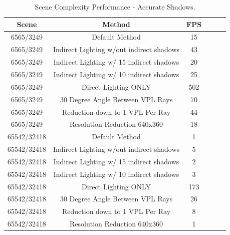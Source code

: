 \begin{table}[h!]\centering
	\caption{Scene Complexity Performance - Accurate Shadows.}
	\begin{center}
	    \begin{tabular}{ | c | c | c | c | c | c |}
	    \hline
	    Scene & Method & FPS\\ \hline
	    6565/3249 & Default Method & 15\\ \hline
	    6565/3249 & Indirect Lighting w/out indirect shadows & 43\\ \hline
	    6565/3249 & Indirect Lighting w/ 15 indirect shadows & 20\\ \hline
	    6565/3249 & Indirect Lighting w/ 10 indirect shadows & 25\\ \hline
	    6565/3249 & Direct Lighting ONLY & 502\\ \hline
	    6565/3249 & 30 Degree Angle Between VPL Rays & 70\\ \hline
	    6565/3249 & Reduction down to 1 VPL Per Ray & 44\\ \hline
	    6565/3249 & Resolution Reduction 640x360 & 18\\ \hline
	    \hline
	    \hline
	    65542/32418 & Default Method & 1\\ \hline
	    65542/32418 & Indirect Lighting w/out indirect shadows & 5\\ \hline
	    65542/32418 & Indirect Lighting w/ 15 indirect shadows & 2\\ \hline
	    65542/32418 & Indirect Lighting w/ 10 indirect shadows & 3\\ \hline
	    65542/32418 & Direct Lighting ONLY & 173\\ \hline
	    65542/32418 & 30 Degree Angle Between VPL Rays & 26\\ \hline
	    65542/32418 & Reduction down to 1 VPL Per Ray & 8\\ \hline
	    65542/32418 & Resolution Reduction 640x360 & 1\\ \hline
	    \end{tabular}
	\end{center}
	\label{table:tech1Complex}
\end{table}

